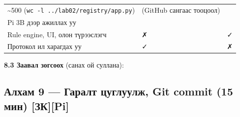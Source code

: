 \begin{longtable}[]{@{}lll@{}}
\begin{minipage}[t]{0.30\columnwidth}
\textasciitilde500 (\texttt{wc\ -l\ .\allowbreak{}.\allowbreak{}/\allowbreak{}lab02/\allowbreak{}registry/\allowbreak{}app.\allowbreak{}py})\strut
\end{minipage} & \begin{minipage}[t]{0.30\columnwidth}\raggedright
(GitHub сангаас тооцоол)\strut
\end{minipage}\tabularnewline
\begin{minipage}[t]{0.30\columnwidth}\raggedright
Pi 3B дээр ажиллах уу\strut
\end{minipage} & \begin{minipage}[t]{0.30\columnwidth}\raggedright
\strut
\end{minipage} & \begin{minipage}[t]{0.30\columnwidth}\raggedright
\strut
\end{minipage}\tabularnewline
\begin{minipage}[t]{0.30\columnwidth}\raggedright
Rule engine, UI, олон түрээслэгч\strut
\end{minipage} & \begin{minipage}[t]{0.30\columnwidth}\raggedright
✗\strut
\end{minipage} & \begin{minipage}[t]{0.30\columnwidth}\raggedright
✓\strut
\end{minipage}\tabularnewline
\begin{minipage}[t]{0.30\columnwidth}\raggedright
Протокол ил харагдах уу\strut
\end{minipage} & \begin{minipage}[t]{0.30\columnwidth}\raggedright
✓\strut
\end{minipage} & \begin{minipage}[t]{0.30\columnwidth}\raggedright
✗\strut
\end{minipage}\tabularnewline
\bottomrule
\end{longtable}\endgroup

\textbf{8.3 Заавал зогсоох} (санах ой суллана):

\begin{Shaded}
\begin{Highlighting}[]
\end{Highlighting}
\end{Shaded}

\hypertarget{ux430ux43bux445ux430ux43c-9-ux433ux430ux440ux430ux43bux442-ux446ux443ux433ux43bux443ux443ux43bux436-git-commit-15-ux43cux438ux43d-ux437ux43api}{%
\subsection{Алхам 9 --- Гаралт цуглуулж, Git commit (15 мин) {[}ЗК{]}{[}Pi{]}}\label{ux430ux43bux445ux430ux43c-9-ux433ux430ux440ux430ux43bux442-ux446ux443ux433ux43bux443ux443ux43bux436-git-commit-15-ux43cux438ux43d-ux437ux43api}}

